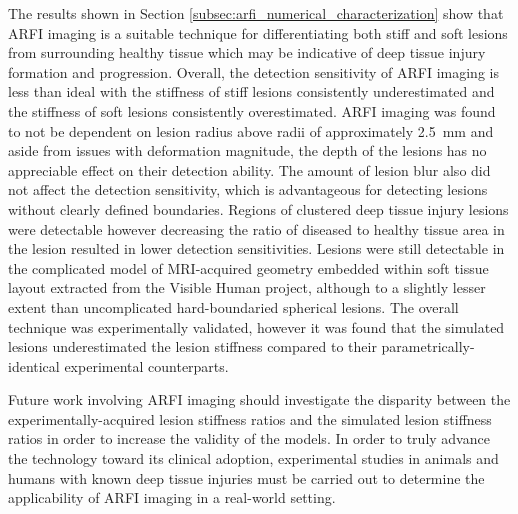 		The results shown in Section \ref{subsec:arfi_numerical_characterization} show that ARFI imaging is a suitable technique for differentiating both stiff and soft lesions from surrounding healthy tissue which may be indicative of deep tissue injury formation and progression. Overall, the detection sensitivity of ARFI imaging is less than ideal with the stiffness of stiff lesions consistently underestimated and the stiffness of soft lesions consistently overestimated. ARFI imaging was found to not be dependent on lesion radius above radii of approximately \SI{2.5}{\mm} and aside from issues with deformation magnitude, the depth of the lesions has no appreciable effect on their detection ability. The amount of lesion blur also did not affect the detection sensitivity, which is advantageous for detecting lesions without clearly defined boundaries. Regions of clustered deep tissue injury lesions were detectable however decreasing the ratio of diseased to healthy tissue area in the lesion resulted in lower detection sensitivities. Lesions were still detectable in the complicated model of MRI-acquired geometry embedded within soft tissue layout extracted from the Visible Human project, although to a slightly lesser extent than uncomplicated hard-boundaried spherical lesions. The overall technique was experimentally validated, however it was found that the simulated lesions underestimated the lesion stiffness compared to their parametrically-identical experimental counterparts.

		Future work involving ARFI imaging should investigate the disparity between the experimentally-acquired lesion stiffness ratios and the simulated lesion stiffness ratios in order to increase the validity of the models. In order to truly advance the technology toward its clinical adoption, experimental studies in animals and humans with known deep tissue injuries must be carried out to determine the applicability of ARFI imaging in a real-world setting.

